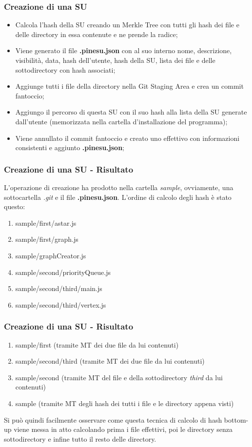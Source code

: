 \documentclass{beamer}
\begin{document}
\begin{frame}
	\frametitle{Creazione di una SU}
	\begin{itemize}
		\item Calcola l'hash della SU creando un Merkle Tree con tutti gli hash dei file e delle directory in essa contenute e ne prende la radice;
		\item Viene generato il file \textbf{.pinesu.json} con al suo interno nome, descrizione, visibilità, data, hash dell'utente, hash della SU, lista dei file e delle sottodirectory con hash associati;
		\item Aggiunge tutti i file della directory nella Git Staging Area e crea un commit fantoccio;
		\item Aggiungo il percorso di questa SU con il suo hash alla lista della SU generate dall'utente (memorizzata nella cartella d'installazione del programma);
		\item Viene annullato il commit fantoccio e creato uno effettivo con informazioni consistenti e aggiunto \textbf{.pinesu.json};
	\end{itemize}
\end{frame}
\begin{frame}
	\frametitle{Creazione di una SU - Risultato}
	L'operazione di creazione ha prodotto nella cartella \emph{sample}, ovviamente, una sottocartella \emph{.git} e il file \textbf{.pinesu.json}. L'ordine di calcolo degli hash è stato questo:
	\begin{enumerate}
		\item sample/first/astar.js
		\item sample/first/graph.js
		\item sample/graphCreator.js
		\item sample/second/priorityQueue.js
		\item sample/second/third/main.js
		\item sample/second/third/vertex.js
		\setcounter{currentenumi}{\theenumi}
	\end{enumerate}
\end{frame}
\begin{frame}
	\frametitle{Creazione di una SU - Risultato}
	\begin{enumerate}
		\setcounter{enumi}{\thecurrentenumi}
		\item sample/first (tramite MT dei due file da lui contenuti)
		\item sample/second/third (tramite MT dei due file da lui contenuti)
		\item sample/second (tramite MT del file e della sottodirectory \emph{third} da lui contenuti)
		\item sample (tramite MT degli hash dei tutti i file e le directory appena visti)
	\end{enumerate}
	Si può quindi facilmente osservare come questa tecnica di calcolo di hash bottom-up viene messa in atto calcolando prima i file effettivi, poi le directory senza sottodirectory e infine tutto il resto delle directory.
	\end{frame}
\end{document}
